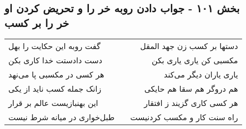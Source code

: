 \begin{center}
\section*{بخش ۱۰۱ - جواب دادن روبه خر را و تحریض کردن او خر را بر کسب}
\label{sec:sh101}
\begin{longtable}{l p{0.5cm} r}
گفت روبه این حکایت را بهل
&&
دستها بر کسب زن جهد المقل
\\
دست دادستت خدا کاری بکن
&&
مکسبی کن یاری یاری بکن
\\
هر کسی در مکسبی پا می‌نهد
&&
یاری یاران دیگر می‌کند
\\
زانک جمله کسب ناید از یکی
&&
هم دروگر هم سقا هم حایکی
\\
این بهنبازیست عالم بر قرار
&&
هر کسی کاری گزیند ز افتقار
\\
طبل‌خواری در میانه شرط نیست
&&
راه سنت کار و مکسب کردنیست
\\
\end{longtable}
\end{center}
